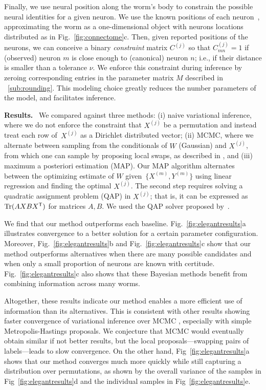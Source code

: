 \documentclass[twoside]{article}
\DeclareRobustCommand{\parhead}[1]{\textbf{#1}~}
\begin{document}
Finally, we use neural position along the worm's body to constrain the
possible neural identities for a given neuron.
We use the known positions of each neuron~\citep{wormatlas}, approximating
the worm as a one-dimensional object with neurons locations distributed
as in Fig.~\ref{fig:connectome}c. Then, given reported positions of the
neurons, we can conceive a binary \textit{constraint} matrix
$C^{(j)}$ so that $C^{(j)}_{mn}=1$ if (observed) neuron $m$ is close enough
to (canonical) neuron $n$; i.e., if their distance is smaller than a
tolerance $\nu$. We enforce this constraint during inference by
zeroing corresponding entries in the parameter matrix $M$ described in
~\ref{sub:rounding}.  This modeling choice greatly reduces the number
parameters of the model, and facilitates inference. 

\parhead{Results.} We compared against three methods: (i) naive
variational inference, where we do not enforce the constraint that
$X^{(j)}$ be a permutation and instead treat each row of~$X^{(j)}$ as
a Dirichlet distributed vector; (ii) MCMC, where we alternate between
sampling from the conditionals of $W$ (Gaussian) and ${X^{(j)}}$, from
which one can sample by proposing local swaps, as described in
\cite{Diaconis2009}, and (iii) maximum a posteriori estimation (MAP).
Our MAP algorithm alternates between the optimizing estimate of $W$ given~$\{X^{(m)}, Y^{(m)}\}$ using linear regression and finding the optimal ${X^{(j)}}$. The second step requires solving a quadratic assignment
problem (QAP) in ${X^{(j)}}$; that is, it can be expressed as
$\mathrm{Tr}(AXBX^{\mathsf{T}})$ for matrices $A,B$. We used the QAP solver
proposed by~\citet{Vogelstein2015}.


We find that our method outperforms each
baseline. Fig.~\ref{fig:elegantresults}a illustrates convergence to a
better solution for a certain parameter configuration. Moreover,
Fig.~\ref{fig:elegantresults}b and Fig.~\ref{fig:elegantresults}c show
that our method outperforms alternatives when there are many possible
candidates and when only a small proportion of neurons are known with
certitude. Fig.~\ref{fig:elegantresults}c also shows that these
Bayesian methods benefit from combining information across many
worms.

Altogether, these results indicate our method enables a more efficient
use of information than its alternatives. This is consistent with
other results showing faster convergence of variational inference over
MCMC \citep{Blei2017}, especially with simple Metropolis-Hastings
proposals. We conjecture that MCMC would eventually obtain similar if
not better results, but the local proposals---swapping pairs of
labels---leads to slow convergence. On the other hand,
Fig~\ref{fig:elegantresults}a shows that our method converges much
more quickly while still capturing a distribution over permutations,
as shown by the overall variance of the samples in Fig~\ref{fig:elegantresults}d and the individual samples in Fig~\ref{fig:elegantresults}e.
\end{document}
